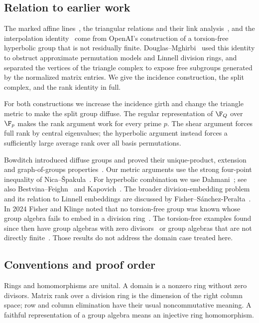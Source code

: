 \subsection*{Relation to earlier work}

The marked affine lines~\cite[Lemma~2.2]{OAI252}, the triangular
relations and their link analysis~\cite[Lemma~2.3]{OAI252}, and the
interpolation identity~\cite[(2.13)--(2.14)]{OAI252} come from OpenAI's
construction of a torsion-free hyperbolic group that is not residually
finite. Douglas--Mghirbi~\cite[Theorems~1.2 and~1.4, Proposition~6.4
and Corollary~6.5]{DM} used this identity to obstruct approximate
permutation models and Linnell division rings, and separated the
vertices of the triangle complex to expose free subgroups generated by
the normalized matrix entries. We give the incidence construction,
the split complex, and the rank identity in full.

For both constructions we increase the incidence girth and change the
triangle metric to make the split group diffuse. The regular
representation of \(\F_Q\) over \(\F_p\) makes the rank argument work
for every prime \(p\). The shear argument forces full rank by central
eigenvalues; the hyperbolic argument instead forces a sufficiently
large average rank over all basis permutations.

Bowditch introduced diffuse groups and proved their unique-product,
extension and graph-of-groups properties~\cite{Bowditch}.
Our metric arguments use the strong four-point inequality of
Nica--\v Spakula~\cite[Definition~4.1 and Theorem~5.1]{NicaSpakula}.
For hyperbolic combination we use
Dahmani~\cite[Theorem~0.1(1) and Proposition~1.11]{Dahmani}; see also
Bestvina--Feighn~\cite{BF,BFAdd} and Kapovich~\cite{Kapovich}.
The broader division-embedding problem and its relation to Linnell
embeddings are discussed by Fisher--S\'anchez-Peralta~\cite{FSP}.
In 2024 Fisher and Klinge noted that no torsion-free group was known
whose group algebra fails to embed in a division ring~\cite[Section~3.2]{FK}.
The torsion-free examples found since then have group algebras with
zero divisors~\cite{DMzd,Ivanov,OAI196} or group algebras that are not
directly finite~\cite{OAI197}. Those results do not address the domain
case treated here.

\subsection*{Conventions and proof order}

Rings and homomorphisms are unital. A domain is a nonzero ring without
zero divisors. Matrix rank over a division ring is the dimension of the
right column space; row and column elimination have their usual
noncommutative meaning. A faithful representation of a group algebra
means an injective ring homomorphism.

